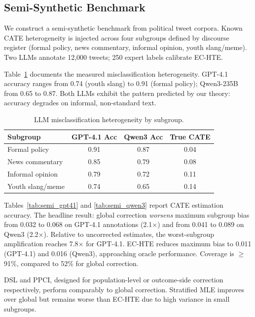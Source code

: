 \documentclass[11pt,a4paper]{article}
\begin{document}
\subsection{Semi-Synthetic Benchmark}
\label{sec:semi_synthetic}

We construct a semi-synthetic benchmark from political tweet corpora.
Known CATE heterogeneity is injected across four subgroups defined by discourse register (formal policy, news commentary, informal opinion, youth slang/meme).
Two LLMs annotate 12,000 tweets; 250 expert labels calibrate EC-HTE.

Table~\ref{tab:llm_heterogeneity} documents the measured misclassification heterogeneity.
GPT-4.1 accuracy ranges from 0.74 (youth slang) to 0.91 (formal policy); Qwen3-235B from 0.65 to 0.87.
Both LLMs exhibit the pattern predicted by our theory: accuracy degrades on informal, non-standard text.

\begin{table}[t]
\centering
\small
\caption{LLM misclassification heterogeneity by subgroup.}
\label{tab:llm_heterogeneity}
\begin{tabular}{l cc c}
\toprule
Subgroup & GPT-4.1 Acc & Qwen3 Acc & True CATE \\
\midrule
Formal policy     & 0.91 & 0.87 & 0.04 \\
News commentary   & 0.85 & 0.79 & 0.08 \\
Informal opinion  & 0.79 & 0.72 & 0.11 \\
Youth slang/meme  & 0.74 & 0.65 & 0.14 \\
\bottomrule
\end{tabular}
\end{table}

Tables~\ref{tab:semi_gpt41} and \ref{tab:semi_qwen3} report CATE estimation accuracy.
The headline result: global correction \emph{worsens} maximum subgroup bias from 0.032 to 0.068 on GPT-4.1 annotations (2.1$\times$) and from 0.041 to 0.089 on Qwen3 (2.2$\times$).
Relative to uncorrected estimates, the worst-subgroup amplification reaches 7.8$\times$ for GPT-4.1.
EC-HTE reduces maximum bias to 0.011 (GPT-4.1) and 0.016 (Qwen3), approaching oracle performance.
Coverage is $\geq$91\%, compared to 52\% for global correction.

DSL and PPCI, designed for population-level or outcome-side correction respectively, perform comparably to global correction.
Stratified MLE improves over global but remains worse than EC-HTE due to high variance in small subgroups.
\end{document}
